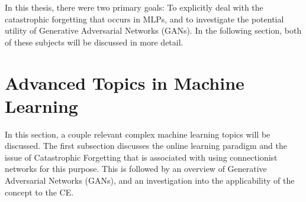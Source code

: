 
	\par In this thesis, there were two primary goals: To explicitly deal with the catastrophic forgetting that occurs in MLPs, and to investigate the potential utility of Generative Adversarial Networks (GANs). In the following section, both of these subjects will be discussed in more detail.
	\clearpage
	\section{Advanced Topics in Machine Learning}
	\par In this section, a couple relevant complex machine learning topics will be discussed. The first subsection discusses the online learning paradigm and the issue of Catastrophic Forgetting that is associated with using connectionist networks for this purpose. This is followed by an overview of Generative Adversarial Networks (GANs), and an investigation into the applicability of the concept to the CE.
